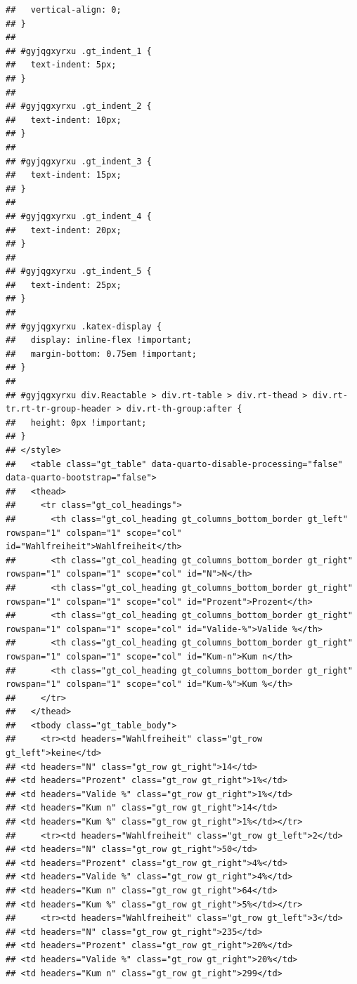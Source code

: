 \documentclass[
  a4paper,
  DIV=11,
  numbers=noendperiod]{scrartcl}
\begin{document}
\begin{verbatim}
##   vertical-align: 0;
## }
## 
## #gyjqgxyrxu .gt_indent_1 {
##   text-indent: 5px;
## }
## 
## #gyjqgxyrxu .gt_indent_2 {
##   text-indent: 10px;
## }
## 
## #gyjqgxyrxu .gt_indent_3 {
##   text-indent: 15px;
## }
## 
## #gyjqgxyrxu .gt_indent_4 {
##   text-indent: 20px;
## }
## 
## #gyjqgxyrxu .gt_indent_5 {
##   text-indent: 25px;
## }
## 
## #gyjqgxyrxu .katex-display {
##   display: inline-flex !important;
##   margin-bottom: 0.75em !important;
## }
## 
## #gyjqgxyrxu div.Reactable > div.rt-table > div.rt-thead > div.rt-tr.rt-tr-group-header > div.rt-th-group:after {
##   height: 0px !important;
## }
## </style>
##   <table class="gt_table" data-quarto-disable-processing="false" data-quarto-bootstrap="false">
##   <thead>
##     <tr class="gt_col_headings">
##       <th class="gt_col_heading gt_columns_bottom_border gt_left" rowspan="1" colspan="1" scope="col" id="Wahlfreiheit">Wahlfreiheit</th>
##       <th class="gt_col_heading gt_columns_bottom_border gt_right" rowspan="1" colspan="1" scope="col" id="N">N</th>
##       <th class="gt_col_heading gt_columns_bottom_border gt_right" rowspan="1" colspan="1" scope="col" id="Prozent">Prozent</th>
##       <th class="gt_col_heading gt_columns_bottom_border gt_right" rowspan="1" colspan="1" scope="col" id="Valide-%">Valide %</th>
##       <th class="gt_col_heading gt_columns_bottom_border gt_right" rowspan="1" colspan="1" scope="col" id="Kum-n">Kum n</th>
##       <th class="gt_col_heading gt_columns_bottom_border gt_right" rowspan="1" colspan="1" scope="col" id="Kum-%">Kum %</th>
##     </tr>
##   </thead>
##   <tbody class="gt_table_body">
##     <tr><td headers="Wahlfreiheit" class="gt_row gt_left">keine</td>
## <td headers="N" class="gt_row gt_right">14</td>
## <td headers="Prozent" class="gt_row gt_right">1%</td>
## <td headers="Valide %" class="gt_row gt_right">1%</td>
## <td headers="Kum n" class="gt_row gt_right">14</td>
## <td headers="Kum %" class="gt_row gt_right">1%</td></tr>
##     <tr><td headers="Wahlfreiheit" class="gt_row gt_left">2</td>
## <td headers="N" class="gt_row gt_right">50</td>
## <td headers="Prozent" class="gt_row gt_right">4%</td>
## <td headers="Valide %" class="gt_row gt_right">4%</td>
## <td headers="Kum n" class="gt_row gt_right">64</td>
## <td headers="Kum %" class="gt_row gt_right">5%</td></tr>
##     <tr><td headers="Wahlfreiheit" class="gt_row gt_left">3</td>
## <td headers="N" class="gt_row gt_right">235</td>
## <td headers="Prozent" class="gt_row gt_right">20%</td>
## <td headers="Valide %" class="gt_row gt_right">20%</td>
## <td headers="Kum n" class="gt_row gt_right">299</td>

\end{verbatim}
\end{document}
